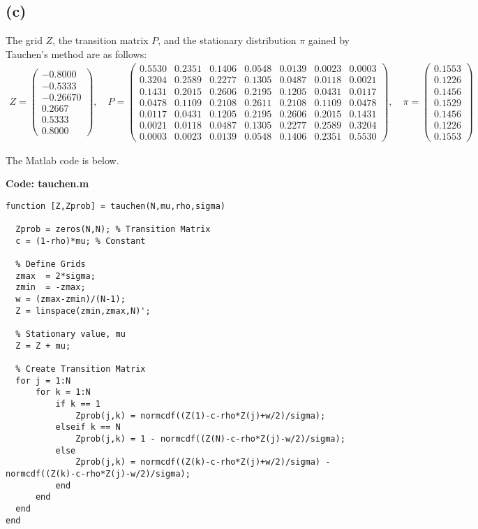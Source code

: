 \documentclass{ltjsarticle}
\begin{document}
\subsection*{(c)}

The grid $Z$, the transition matrix $P$, and the stationary distribution $\pi$ gained by Tauchen's method are as follows:
\begin{gather*}
    Z = \begin{pmatrix}
        -0.8000\\
        -0.5333\\
        -0.2667
              0\\
        0.2667\\
        0.5333\\
        0.8000
    \end{pmatrix}
    , \quad
    P = \begin{pmatrix}
        0.5530 & 0.2351 & 0.1406 & 0.0548 & 0.0139 & 0.0023 & 0.0003\\
        0.3204 & 0.2589 & 0.2277 & 0.1305 & 0.0487 & 0.0118 & 0.0021\\
        0.1431 & 0.2015 & 0.2606 & 0.2195 & 0.1205 & 0.0431 & 0.0117\\
        0.0478 & 0.1109 & 0.2108 & 0.2611 & 0.2108 & 0.1109 & 0.0478\\
        0.0117 & 0.0431 & 0.1205 & 0.2195 & 0.2606 & 0.2015 & 0.1431\\
        0.0021 & 0.0118 & 0.0487 & 0.1305 & 0.2277 & 0.2589 & 0.3204\\
        0.0003 & 0.0023 & 0.0139 & 0.0548 & 0.1406 & 0.2351 & 0.5530
    \end{pmatrix}
    , \quad
    \pi = \begin{pmatrix}
        0.1553\\
        0.1226\\
        0.1456\\
        0.1529\\
        0.1456\\
        0.1226\\
        0.1553
    \end{pmatrix}
\end{gather*}

The Matlab code is below.

\noindent\textbf{Code: tauchen.m}
\lstset{style=matlab}
\begin{lstlisting}
function [Z,Zprob] = tauchen(N,mu,rho,sigma)

  Zprob = zeros(N,N); % Transition Matrix
  c = (1-rho)*mu; % Constant

  % Define Grids 
  zmax  = 2*sigma;
  zmin  = -zmax;
  w = (zmax-zmin)/(N-1);
  Z = linspace(zmin,zmax,N)';

  % Stationary value, mu
  Z = Z + mu;

  % Create Transition Matrix
  for j = 1:N
      for k = 1:N
          if k == 1
              Zprob(j,k) = normcdf((Z(1)-c-rho*Z(j)+w/2)/sigma);
          elseif k == N
              Zprob(j,k) = 1 - normcdf((Z(N)-c-rho*Z(j)-w/2)/sigma);
          else
              Zprob(j,k) = normcdf((Z(k)-c-rho*Z(j)+w/2)/sigma) - normcdf((Z(k)-c-rho*Z(j)-w/2)/sigma);
          end
      end
  end
end
\end{lstlisting}
\end{document}
